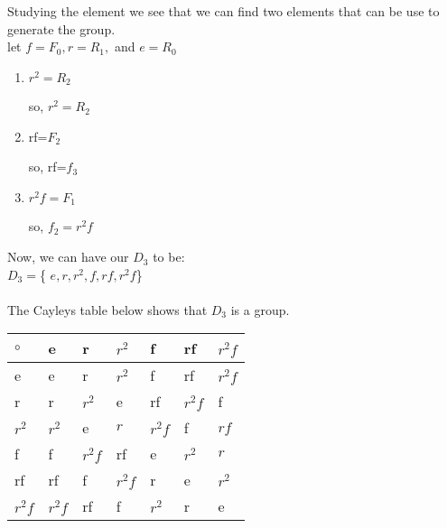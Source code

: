 \documentclass{article}
\begin{document}
\newcommand{\MidText}[1]{
\begin{tikzpicture}
    \draw [color=white](0,-3) -- (0,3);
    \draw [color=white](-0.4,0) -- (0.4,0);
    \draw[color=white](-0.4,0) -- (0.4,0);
    \node at (0,0.3) {$#1$};
\end{tikzpicture}}

Studying the element we see that we can find two elements that can
be use to generate the group.\\
let $f=F_0, r=R_1,$ and $e=R_0$\\

\begin{enumerate}
    \item  $r^2=R_2$
  
so,  $r^2=R_2$

\item  rf=$F_2$
    
so,  rf=$f_3$

\item  $r^2f=F_1$

so, $f_2=r^2f$
\end{enumerate}
Now, we can have our $D_3$ to be:\\
 $D_3=$\{ $e,r,r^2,f,rf,r^2f$\}\\\\
 
The Cayleys table below shows that $D_3$ is a group.\\
\begin{tabular}{| l | l | l | l |l |l |l |}
    
    $\circ$  & e & r& $r^2$& f &rf & $r^2f$ \\ 
    \hline
    e  & e & r& $r^2$& f &rf & $r^2f$ \\
     \hline
    r & r& $r^2$& e & rf & $r^2f$&f \\
    \hline
    $r^2$ &$r^2$ & e& $r$&$r^2f$  &f & $rf$ \\
    \hline
    f &f& $r^2f$& rf& e & $r^2$ & $r$ \\
     \hline
    rf & rf& f & $r^2f$ & r &e& $r^2$ \\
     \hline
    $r^2f$ &$r^2f$&rf &f& $r^2$ & r& e \\
    \hline
    \end{tabular}
\end{document}
